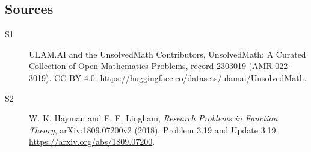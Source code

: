 \documentclass[11pt]{article}
\begin{document}
\subsection{Sources}
\begin{description}
\item[\hypertarget{source:2303019:1}{S1}] ULAM.AI and the UnsolvedMath Contributors, UnsolvedMath: A Curated Collection of Open Mathematics Problems, record 2303019 (AMR-022-3019). CC BY 4.0. \url{https://huggingface.co/datasets/ulamai/UnsolvedMath}.
\item[\hypertarget{source:2303019:2}{S2}] W. K. Hayman and E. F. Lingham, \emph{Research Problems in Function Theory}, arXiv:1809.07200v2 (2018), Problem 3.19 and Update 3.19. \url{https://arxiv.org/abs/1809.07200}.
\end{description}
\label{end:2303019}
\end{document}
